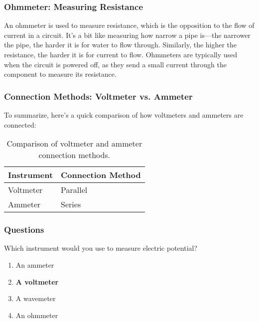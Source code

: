 \subsubsection*{Ohmmeter: Measuring Resistance}

An ohmmeter is used to measure resistance, which is the opposition to the flow of current in a circuit. It's a bit like measuring how narrow a pipe is—the narrower the pipe, the harder it is for water to flow through. Similarly, the higher the resistance, the harder it is for current to flow. Ohmmeters are typically used when the circuit is powered off, as they send a small current through the component to measure its resistance.

\subsubsection*{Connection Methods: Voltmeter vs. Ammeter}

To summarize, here's a quick comparison of how voltmeters and ammeters are connected:

\begin{table}[h]
    \centering
    \begin{tabular}{|l|l|}
        \hline
        \textbf{Instrument} & \textbf{Connection Method} \\
        \hline
        Voltmeter & Parallel \\
        \hline
        Ammeter & Series \\
        \hline
    \end{tabular}
    \caption{Comparison of voltmeter and ammeter connection methods.}
    \label{tab:voltmeter-ammeter-comparison}
\end{table}

\subsubsection{Questions}

\begin{tcolorbox}[colback=gray!10!white,colframe=black!75!black,title={T7D01}]
    Which instrument would you use to measure electric potential?
    \begin{enumerate}[label=\Alph*),noitemsep]
        \item An ammeter
        \item \textbf{A voltmeter}
        \item A wavemeter
        \item An ohmmeter
    \end{enumerate}
\end{tcolorbox}

